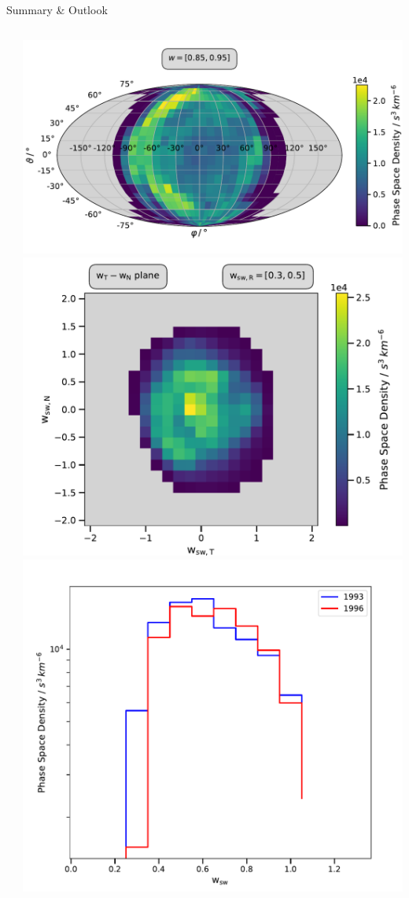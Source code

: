 \documentclass{beamer}
\begin{document}
\begin{frame}[plain]{Summary \& Outlook}
\begin{columns}
{\begin{itemize}
	\end{itemize}}
	\column{5cm}
		\includegraphics[scale=.2]{Pics/sky_ps.pdf}
		\includegraphics[scale=.21]{Pics/cart_50_ps_R.pdf}
		\includegraphics[scale=.16]{Pics/1D.pdf}
		
\end{columns}


\end{frame}
\end{document}
